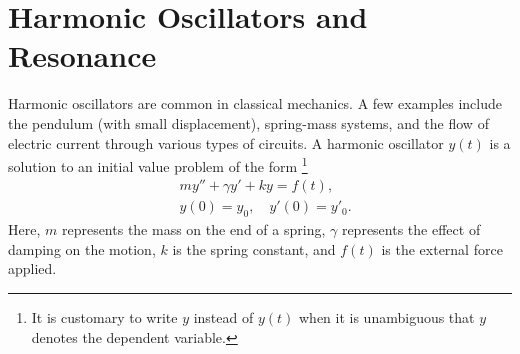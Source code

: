 \section*{Harmonic Oscillators and Resonance}
Harmonic oscillators are common in classical mechanics.
A few examples include the pendulum (with small displacement), spring-mass systems, and the flow of electric current through various types of circuits.
A harmonic oscillator $y(t)$ is a solution to an initial value problem of the form \footnote{It is customary to write $y$ instead of $y(t)$ when it is unambiguous that $y$ denotes the dependent variable.}
\begin{align*}
	&{}my'' + \gamma y' + ky = f(t) ,\\
	&{}y(0) = y_0,\quad
	y'(0) = y'_0.
\end{align*}
Here, $m$ represents the mass on the end of a spring, $\gamma$ represents the effect of damping on the motion, $k$ is the spring constant, and $f(t)$ is the external force applied.

